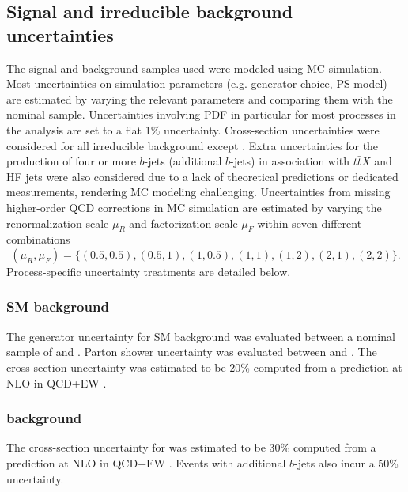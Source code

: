 \documentclass[../thesis.tex]{subfiles}
\begin{document}
\subsection{Signal and irreducible background uncertainties}
The signal and background samples used were modeled using \acs{MC} simulation. Most uncertainties on simulation parameters (e.g. generator choice, \acs{PS} model) are estimated by varying the relevant parameters and comparing them with the nominal sample. Uncertainties involving \acs{PDF} in particular for most processes in the analysis are set to a flat 1\% uncertainty. Cross-section uncertainties were considered for all irreducible background except \ttW. 
Extra uncertainties for the production of four or more $b$-jets (additional $b$-jets) in association with $t\bar{t}X$ and \acs{HF} jets were also considered due to a lack of theoretical predictions or dedicated measurements, rendering \acs{MC} modeling challenging. Uncertainties from missing higher-order \acs{QCD} corrections in \acs{MC} simulation are estimated by varying the renormalization scale $\mu_R$ and factorization scale $\mu_F$ within seven different combinations
\[
(\mu_R, \mu_F) = \{(0.5,0.5), (0.5,1), (1,0.5), (1,1), (1,2), (2,1), (2,2)\}.
\]
Process-specific uncertainty treatments are detailed below.

\subsubsection*{SM \tttt background}
The generator uncertainty for \acs{SM} \tttt background was evaluated between a nominal sample of \mgamc and \sherpa. Parton shower uncertainty was evaluated between \pythia and \herwig. The cross-section uncertainty was estimated to be 20\% computed from a prediction at \acs{NLO} in \acs{QCD}+\acs{EW} \citep{Frederix:2017wme}.

\subsubsection*{\ttt background}
The cross-section uncertainty for \ttt was estimated to be 30\% computed from a prediction at \acs{NLO} in \acs{QCD}+\acs{EW} \citep{Frederix:2017wme}. Events with additional $b$-jets also incur a 50\% uncertainty.
\end{document}
